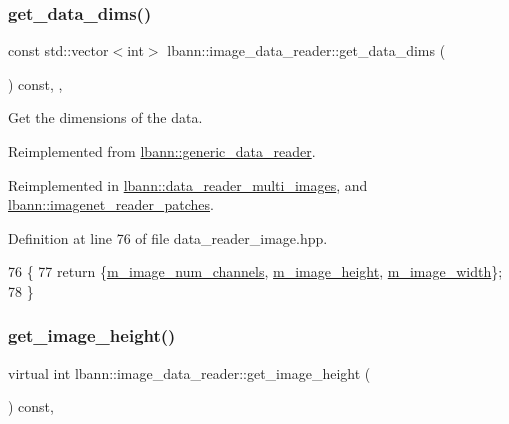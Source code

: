 \subsubsection{\texorpdfstring{get\+\_\+data\+\_\+dims()}{get\_data\_dims()}}
{\footnotesize\ttfamily const std\+::vector$<$int$>$ lbann\+::image\+\_\+data\+\_\+reader\+::get\+\_\+data\+\_\+dims (\begin{DoxyParamCaption}{ }\end{DoxyParamCaption}) const\hspace{0.3cm}{\ttfamily [inline]}, {\ttfamily [override]}, {\ttfamily [virtual]}}



Get the dimensions of the data. 



Reimplemented from \hyperlink{classlbann_1_1generic__data__reader_ae06ff27459ac4a5d8ac14655d4b31318}{lbann\+::generic\+\_\+data\+\_\+reader}.



Reimplemented in \hyperlink{classlbann_1_1data__reader__multi__images_aca93e0ab0edf13397de414d41aff1cd1}{lbann\+::data\+\_\+reader\+\_\+multi\+\_\+images}, and \hyperlink{classlbann_1_1imagenet__reader__patches_a4d5c6b9780908d9beb5c6d3f017c38b5}{lbann\+::imagenet\+\_\+reader\+\_\+patches}.



Definition at line 76 of file data\+\_\+reader\+\_\+image.\+hpp.


\begin{DoxyCode}
76                                                       \{
77     \textcolor{keywordflow}{return} \{\hyperlink{classlbann_1_1image__data__reader_aab1a440f361521dc7bd583cefe1061f8}{m\_image\_num\_channels}, \hyperlink{classlbann_1_1image__data__reader_a0632efa3deaa9d61e671f741909eb3fe}{m\_image\_height}, 
      \hyperlink{classlbann_1_1image__data__reader_af001f3d1c0f1c580b66988233b3a64f0}{m\_image\_width}\};
78   \}
\end{DoxyCode}
\mbox{\label{classlbann_1_1image__data__reader_a641364038b54fe8291f23f9d879293e3}} 
\subsubsection{\texorpdfstring{get\+\_\+image\+\_\+height()}{get\_image\_height()}}
{\footnotesize\ttfamily virtual int lbann\+::image\+\_\+data\+\_\+reader\+::get\+\_\+image\+\_\+height (\begin{DoxyParamCaption}{ }\end{DoxyParamCaption}) const\hspace{0.3cm}{\ttfamily [inline]}, {\ttfamily [virtual]}}



